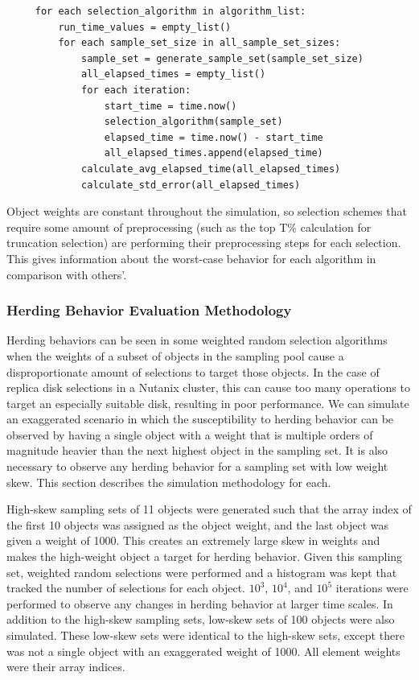 \documentclass[12pt]{article}
\begin{document}
     \begin{verbatim}
     for each selection_algorithm in algorithm_list:
         run_time_values = empty_list()
         for each sample_set_size in all_sample_set_sizes:
             sample_set = generate_sample_set(sample_set_size)
             all_elapsed_times = empty_list()
             for each iteration:
                 start_time = time.now()
                 selection_algorithm(sample_set)
                 elapsed_time = time.now() - start_time
                 all_elapsed_times.append(elapsed_time)
             calculate_avg_elapsed_time(all_elapsed_times)
             calculate_std_error(all_elapsed_times)
     \end{verbatim}
        
    Object weights are constant throughout the simulation, so selection schemes
    that require some amount of preprocessing (such as the top T\% calculation
    for truncation selection) are performing their preprocessing steps for each
    selection. This gives information about the worst-case behavior for each
    algorithm in comparison with others'.

    \subsubsection{Herding Behavior Evaluation Methodology}
    Herding behaviors can be seen in some weighted random selection
    algorithms when the weights of a subset of objects in the sampling pool
    cause a disproportionate amount of selections to target those objects. In
    the case of replica disk selections in a Nutanix cluster, this can cause
    too many operations to target an especially suitable disk, resulting in
    poor performance. We can simulate an exaggerated scenario in which the
    susceptibility to herding behavior can be observed by having a single
    object with a weight that is multiple orders of magnitude heavier than the
    next highest object in the sampling set. It is also necessary to observe
    any herding behavior for a sampling set with low weight skew. This section
    describes the simulation methodology for each.

    High-skew sampling sets of 11 objects were generated such that the array
    index of the first 10 objects was assigned as the object weight, and the
    last object was given a weight of 1000. This creates an extremely large
    skew in weights and makes the high-weight object a target for herding
    behavior. Given this sampling set, weighted random selections were
    performed and a histogram was kept that tracked the number of selections
    for each object. $10^3$, $10^4$, and $10^5$ iterations were performed to observe any
    changes in herding behavior at larger time scales. In addition to the
    high-skew sampling sets, low-skew sets of 100 objects were also simulated.
    These low-skew sets were identical to the high-skew sets, except there was
    not a single object with an exaggerated weight of 1000. All element weights
    were their array indices.
\end{document}
